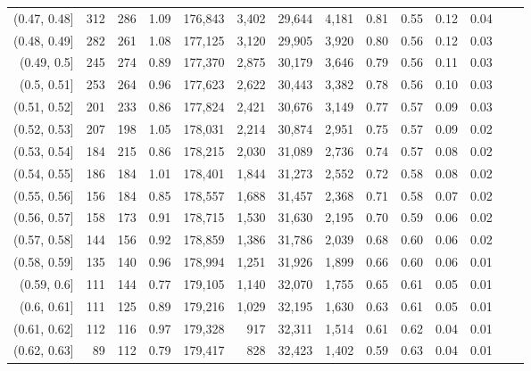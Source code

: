 \begin{tabular}{rrrrrrrrrrrrrr}
(0.47, 0.48]   &     312 &    286 &    1.09 &  176,843 &    3,402 &  29,644 &   4,181 &  0.81 &  0.55 &  0.12 &      0.04 \\
(0.48, 0.49]   &     282 &    261 &    1.08 &  177,125 &    3,120 &  29,905 &   3,920 &  0.80 &  0.56 &  0.12 &      0.03 \\
(0.49, 0.5]    &     245 &    274 &    0.89 &  177,370 &    2,875 &  30,179 &   3,646 &  0.79 &  0.56 &  0.11 &      0.03 \\
(0.5, 0.51]    &     253 &    264 &    0.96 &  177,623 &    2,622 &  30,443 &   3,382 &  0.78 &  0.56 &  0.10 &      0.03 \\
(0.51, 0.52]   &     201 &    233 &    0.86 &  177,824 &    2,421 &  30,676 &   3,149 &  0.77 &  0.57 &  0.09 &      0.03 \\
(0.52, 0.53]   &     207 &    198 &    1.05 &  178,031 &    2,214 &  30,874 &   2,951 &  0.75 &  0.57 &  0.09 &      0.02 \\
(0.53, 0.54]   &     184 &    215 &    0.86 &  178,215 &    2,030 &  31,089 &   2,736 &  0.74 &  0.57 &  0.08 &      0.02 \\
(0.54, 0.55]   &     186 &    184 &    1.01 &  178,401 &    1,844 &  31,273 &   2,552 &  0.72 &  0.58 &  0.08 &      0.02 \\
(0.55, 0.56]   &     156 &    184 &    0.85 &  178,557 &    1,688 &  31,457 &   2,368 &  0.71 &  0.58 &  0.07 &      0.02 \\
(0.56, 0.57]   &     158 &    173 &    0.91 &  178,715 &    1,530 &  31,630 &   2,195 &  0.70 &  0.59 &  0.06 &      0.02 \\
(0.57, 0.58]   &     144 &    156 &    0.92 &  178,859 &    1,386 &  31,786 &   2,039 &  0.68 &  0.60 &  0.06 &      0.02 \\
(0.58, 0.59]   &     135 &    140 &    0.96 &  178,994 &    1,251 &  31,926 &   1,899 &  0.66 &  0.60 &  0.06 &      0.01 \\
(0.59, 0.6]    &     111 &    144 &    0.77 &  179,105 &    1,140 &  32,070 &   1,755 &  0.65 &  0.61 &  0.05 &      0.01 \\
(0.6, 0.61]    &     111 &    125 &    0.89 &  179,216 &    1,029 &  32,195 &   1,630 &  0.63 &  0.61 &  0.05 &      0.01 \\
(0.61, 0.62]   &     112 &    116 &    0.97 &  179,328 &      917 &  32,311 &   1,514 &  0.61 &  0.62 &  0.04 &      0.01 \\
(0.62, 0.63]   &      89 &    112 &    0.79 &  179,417 &      828 &  32,423 &   1,402 &  0.59 &  0.63 &  0.04 &      0.01 \\

\end{tabular}
